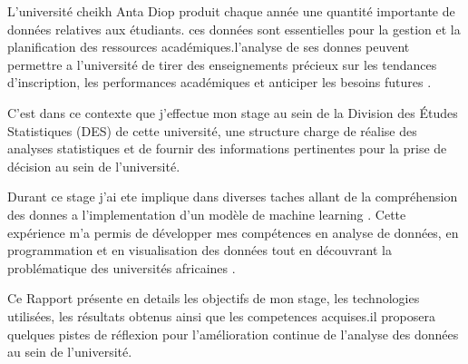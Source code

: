 
L'université cheikh Anta Diop produit chaque année une quantité importante de données relatives aux étudiants.  
ces données sont essentielles pour la gestion et la planification des ressources académiques.l'analyse de ses donnes peuvent permettre a l'université 
de tirer des enseignements précieux sur les tendances d'inscription, les performances académiques et anticiper les besoins futures . 

C'est dans ce contexte que j'effectue mon stage au sein de la Division des Études Statistiques (DES) de cette université, 
une structure charge de réalise des analyses statistiques et de fournir des informations pertinentes pour la prise de décision au sein de l'université.

Durant ce stage  j'ai ete implique dans diverses taches allant de la compréhension des donnes a l'implementation d'un modèle de machine learning . 
Cette expérience m'a permis de développer mes compétences en analyse de données, en programmation et en visualisation des données tout en découvrant la problématique des universités africaines .

Ce Rapport présente en details les objectifs de mon stage, les technologies utilisées, les résultats obtenus  ainsi que les competences acquises.il proposera quelques pistes de réflexion pour l'amélioration continue de l'analyse des données au sein de l'université.


